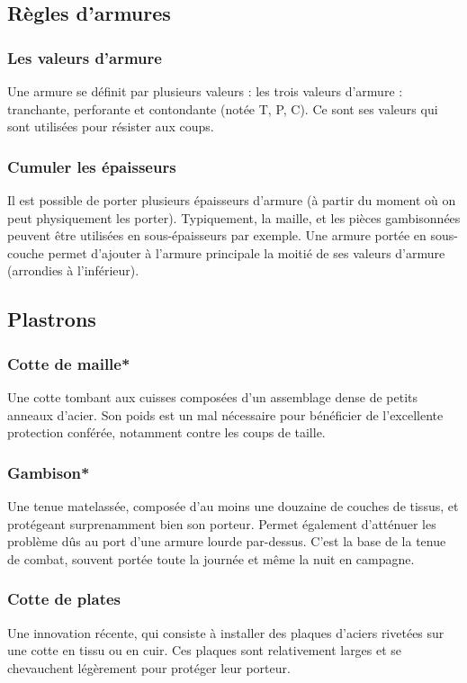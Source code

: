 \documentclass[10pt,a4paper,twocolumn]{book}
\begin{document}
\subsection{Règles d’armures}
\subsubsection{Les valeurs d'armure}
Une armure se définit par plusieurs valeurs :  les trois valeurs d’armure : tranchante, perforante et contondante (notée T, P, C). Ce sont ses valeurs qui sont utilisées pour résister aux coups. 
\subsubsection{Cumuler les épaisseurs}
Il est possible de porter plusieurs épaisseurs d’armure (à partir du moment où on peut physiquement les porter). Typiquement, la maille,  et les pièces gambisonnées peuvent être utilisées en sous-épaisseurs par exemple.
Une armure portée en sous-couche permet d’ajouter à l’armure principale la moitié de ses valeurs d’armure (arrondies à l’inférieur).
\subsection{Plastrons}
\subsubsection{Cotte de maille*}
Une cotte tombant aux cuisses composées d'un assemblage dense de petits anneaux d'acier. Son poids est un mal nécessaire pour bénéficier de l'excellente protection conférée, notamment contre les coups de taille.
\subsubsection{Gambison*}
Une tenue matelassée, composée d'au moins une douzaine de couches de tissus, et protégeant surprenamment bien son porteur. Permet également d'atténuer les problème dûs au port d'une armure lourde par-dessus. C'est la base de la tenue de combat, souvent portée toute la journée et même la nuit en campagne.
\subsubsection{Cotte de plates}
Une innovation récente, qui consiste à installer des plaques d'aciers rivetées sur une cotte en tissu ou en cuir. Ces plaques sont relativement larges et se chevauchent légèrement pour protéger leur porteur.
\end{document}
